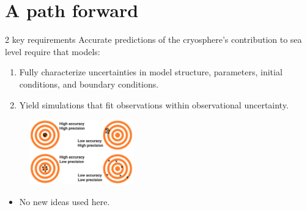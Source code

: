 \documentclass[hide notes,intlimits]{beamer}
\begin{document}
\part{A path forward}

\frame{\partpage}

  {
}

\begin{frame}{2 key requirements}
Accurate predictions of the cryosphere's contribution to sea level require that models:
\begin{enumerate}
    \item Fully characterize uncertainties in model structure, parameters, initial conditions, and boundary conditions.
    \item Yield simulations that fit observations within observational uncertainty. 
\end{enumerate}
  \begin{figure}
    \includegraphics[width=0.4\textwidth]{difference-accuracy-and-precision}
  \end{figure}
  \begin{itemize}
    \item \alert{No new ideas used here.}
  \end{itemize}
\end{frame}
\end{document}
